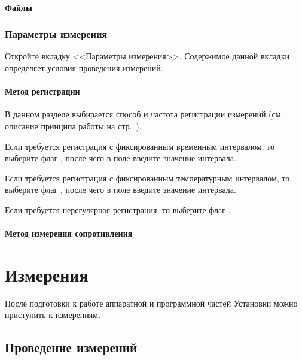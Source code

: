 \documentclass[12pt, a4paper, twocolumn]{report}
\begin{document}
\subsubsection{Файлы}



\subsection{Параметры измерения}

Откройте вкладку <<Параметры измерения>>. Содержимое данной вкладки определяет условия проведения измерений.

\subsubsection{Метод регистрации}
\label{sec_reg_method}

В данном разделе выбирается способ и частота регистрации измерений (см. описание принципа работы на стр.~\pageref{sec_registration_types}).

Если требуется регистрация с фиксированным временным интервалом, то выберите флаг , после чего в поле  введите значение интервала.

Если требуется регистрация с фиксированным температурным интервалом, то выберите флаг , после чего в поле  введите значение интервала.

Если требуется нерегулярная регистрация, то выберите флаг .

\subsubsection{Метод измерения сопротивления}



\chapter{Измерения}

После подготовки к работе аппаратной и программной частей Установки можно приступить к измерениям.

\section{Проведение измерений}
\end{document}
